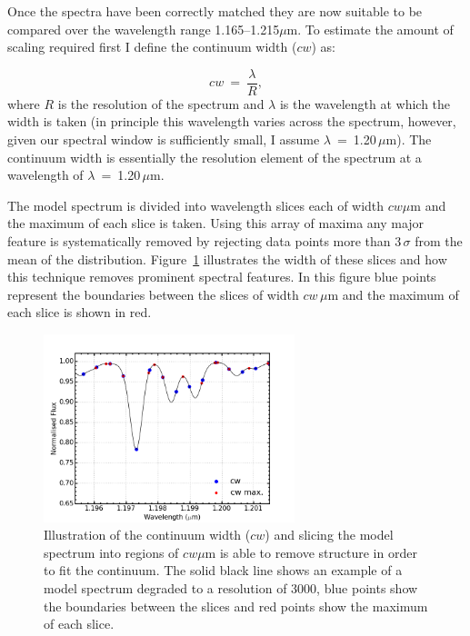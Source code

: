 Once the spectra have been correctly matched they are now suitable to be compared over the wavelength range 1.165--1.215$\mu$m.
To estimate the amount of scaling required first I define the continuum width ($cw$) as:

\begin{equation}
    cw~=~\frac{\lambda}{R}, %
\end{equation}
\noindent where $R$ is the resolution of the spectrum and
$\lambda$ is the wavelength at which the width is taken
(in principle this wavelength varies across the spectrum, however, given our spectral window is sufficiently small, I assume $\lambda$~=~1.20\,$\mu$m).
The continuum width is essentially the resolution element of the spectrum at a wavelength of
$\lambda$~=~1.20\,$\mu$m.

The model spectrum is divided into wavelength slices each of width $cw\mu$m and the maximum of each slice is taken.
Using this array of maxima any major feature is systematically removed by rejecting data points more than 3\,$\sigma$ from the mean of the distribution.
Figure~\ref{fig:cw} illustrates the width of these slices and how this technique removes prominent spectral features.
In this figure blue points represent the boundaries between the slices of width $cw\,\mu$m and the maximum of each slice is shown in red.


\begin{figure}
 \centering
\includegraphics[width=0.65\textwidth]{JAnal/cw}
\caption[Illustration of continuum width slices and maxima on an individual diagnostic lines]{
Illustration of the continuum width ($cw$) and slicing the model spectrum into regions of $cw\mu$m is able to remove structure in order to fit the continuum.
The solid black line shows an example of a model spectrum degraded to a resolution of 3000,
blue points show the boundaries between the slices and red points show the maximum of each slice.\label{fig:cw}
         }
\end{figure}


